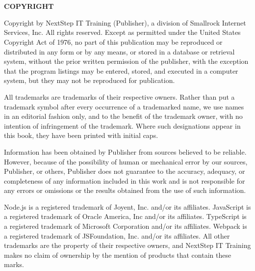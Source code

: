 \documentclass[../workbook]{subfiles}
\begin{document}

\section*{\bookcoursenumber{} \bookmajortitle}

\parbox{\textwidth}{

    \footnotesize
    \raggedright
    \setlength{\parskip}{1.25em}

    \par{
        \textbf{COPYRIGHT}
    }

    \par{
        Copyright \bookcopyrightyears{} by NextStep IT Training (Publisher), a division of Smallrock Internet Services, Inc.
        All rights reserved. Except as permitted under the United States Copyright Act of 1976, no part of this publication may be reproduced or distributed in any form or by any means, or stored in a database or retrieval system, without the prior written permission of the publisher, with the exception that the program listings may be entered, stored, and executed in a computer system, but they may not be reproduced for publication.
    }
    

    \par{
        All trademarks are trademarks of their respective owners.
        Rather than put a trademark symbol after every occurrence of a trademarked name, we use names in an editorial fashion only, and to the benefit of the trademark owner, with no intention of infringement of the trademark.
        Where such designations appear in this book, they have been printed with initial caps.
    }

    \par{
        Information has been obtained by Publisher from sources believed to be reliable.
        However, because of the possibility of human or mechanical error by our sources, Publisher, or others, Publisher does not guarantee to the accuracy, adequacy, or completeness of any information included in this work and is not responsible for any errors or omissions or the results obtained from the use of such information.
    }

    \par{
        Node.js is a registered trademark of Joyent, Inc. and/or its affiliates.
        JavaScript is a registered trademark of Oracle America, Inc and/or its affiliates.
        TypeScript is a registered trademark of Microsoft Corporation and/or its affiliates.
        Webpack is a registered trademark of JSFoundation, Inc. and/or its affiliates.
        All other trademarks are the property of their respective owners, and NextStep IT Training makes no claim of ownership by the mention of products that contain these marks.
    }

}
\end{document}
